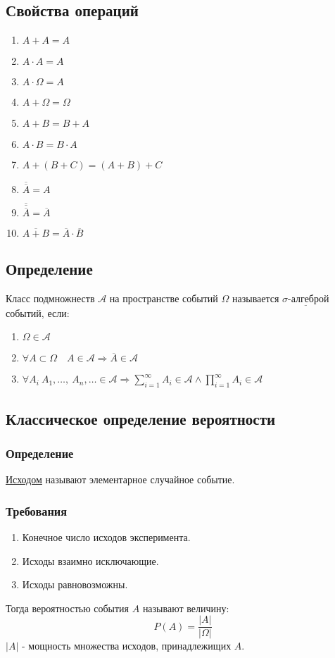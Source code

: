 \documentclass[12pt, a4paper]{article}
\begin{document}
    \subsection*{Свойства операций}
    \begin{enumerate}
        \item $A + A = A$
        \item $A\cdot A = A$
        \item $A\cdot \Omega = A$
        \item $A + \Omega = \Omega$
        \item $A + B = B + A$
        \item $A\cdot B = B\cdot A$
        \item $A + (B + C) = (A + B) + C$
        \item $\overline{\overline{A}} = A$
        \item $\overline{\overline{\overline{A}}} = \overline{A}$
        \item $\overline{A + B} = \overline{A}\cdot\overline{B}$
    \end{enumerate}

    \subsection*{Определение}
    Класс подмножнеств $\mathcal{A}$ на пространстве событий $\Omega$ называется 
   $\underline{\text{$\sigma$-алгеброй}}$ событий, если:
    \begin{enumerate}
        \item $\Omega\in \mathcal{A}$
        \item $\forall A\subset\Omega\quad A\in \mathcal{A}\Rightarrow \overline{A}\in\mathcal{A}$
        \item $\forall A_i\ A_1,\dots,\ A_n,\dots \in \mathcal{A}\Rightarrow \displaystyle\sum_{i = 1}^{\infty} A_i\in \mathcal{A} \wedge \prod_{i = 1}^{\infty} A_i\in \mathcal{A}$
    \end{enumerate}
    \subsection*{Классическое определение вероятности}
    \subsubsection*{Определение}
    \underline{Исходом} называют элементарное случайное событие.
    \subsubsection*{Требования}
    \begin{enumerate}
        \item Конечное число исходов эксперимента.
        \item Исходы взаимно исключающие.
        \item Исходы равновозможны.
    \end{enumerate}
    Тогда вероятностью события $A$ называют величину:
    \[P(A) = \frac{|A|}{|\Omega|}\]
    $|A|$ - мощность множества исходов, принадлежищих $A$.
\end{document}
